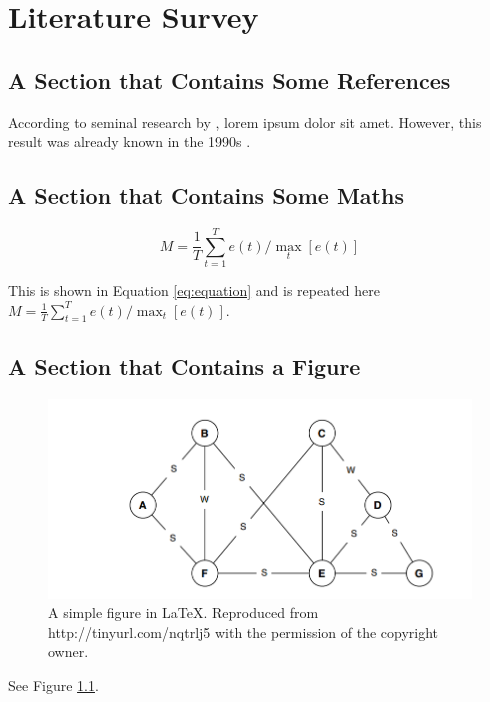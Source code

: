 \chapter{Literature Survey}

\section{A Section that Contains Some References}

According to seminal research by \cite{Reference1}, lorem ipsum dolor sit amet.  However, this result was already known in the 1990s \citep{Reference2,Reference3}.  %


\section{A Section that Contains Some Maths}

 
\begin{equation}
M = \frac{1}{T}\sum_{t=1}^{T} e(t) / \max_{t}[e(t)]
\label{eq:equation}
\end{equation}


This is shown in Equation \ref{eq:equation} and is repeated here $M = \frac{1}{T}\sum_{t=1}^{T} e(t) / \max_{t}[e(t)]$.


\section{A Section that Contains a Figure}


\begin{figure}[ht]
\includegraphics[width=15cm]{figures/figure1.png}
\caption{A simple figure in \LaTeX. Reproduced from http://tinyurl.com/nqtrlj5 with the permission of the copyright owner.}
\label{fig:graph}
\end{figure}


See Figure \ref{fig:graph}.


